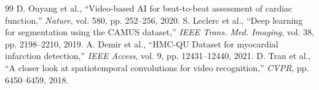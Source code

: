 \documentclass[journal]{IEEEtran}
\begin{document}
\begin{thebibliography}{99}
 D. Ouyang et al., ``Video-based AI for beat-to-beat assessment of cardiac function,'' \emph{Nature}, vol. 580, pp. 252--256, 2020.
 S. Leclerc et al., ``Deep learning for segmentation using the CAMUS dataset,'' \emph{IEEE Trans. Med. Imaging}, vol. 38, pp. 2198--2210, 2019.
 A. Demir et al., ``HMC-QU Dataset for myocardial infarction detection,'' \emph{IEEE Access}, vol. 9, pp. 12431--12440, 2021.
 D. Tran et al., ``A closer look at spatiotemporal convolutions for video recognition,'' \emph{CVPR}, pp. 6450--6459, 2018.
\end{thebibliography}
\end{document}
